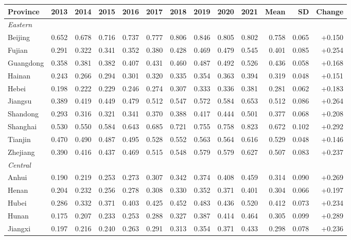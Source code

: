 \begin{tabular}{lrrrrrrrrrrrr}
\toprule
Province & 2013 & 2014 & 2015 & 2016 & 2017 & 2018 & 2019 & 2020 & 2021 & Mean & SD & Change \\
\midrule
\multicolumn{13}{l}{\textit{Eastern}} \\
Beijing & 0.652 & 0.678 & 0.716 & 0.737 & 0.777 & 0.806 & 0.846 & 0.805 & 0.802 & 0.758 & 0.065 & +0.150 \\
Fujian & 0.291 & 0.322 & 0.341 & 0.352 & 0.380 & 0.428 & 0.469 & 0.479 & 0.545 & 0.401 & 0.085 & +0.254 \\
Guangdong & 0.358 & 0.381 & 0.382 & 0.407 & 0.431 & 0.460 & 0.487 & 0.492 & 0.526 & 0.436 & 0.058 & +0.168 \\
Hainan & 0.243 & 0.266 & 0.294 & 0.301 & 0.320 & 0.335 & 0.354 & 0.363 & 0.394 & 0.319 & 0.048 & +0.151 \\
Hebei & 0.198 & 0.222 & 0.229 & 0.246 & 0.274 & 0.307 & 0.333 & 0.336 & 0.381 & 0.281 & 0.062 & +0.183 \\
Jiangsu & 0.389 & 0.419 & 0.449 & 0.479 & 0.512 & 0.547 & 0.572 & 0.584 & 0.653 & 0.512 & 0.086 & +0.264 \\
Shandong & 0.293 & 0.316 & 0.321 & 0.341 & 0.370 & 0.388 & 0.417 & 0.444 & 0.501 & 0.377 & 0.068 & +0.208 \\
Shanghai & 0.530 & 0.550 & 0.584 & 0.643 & 0.685 & 0.721 & 0.755 & 0.758 & 0.823 & 0.672 & 0.102 & +0.292 \\
Tianjin & 0.470 & 0.490 & 0.487 & 0.495 & 0.528 & 0.552 & 0.563 & 0.564 & 0.616 & 0.529 & 0.048 & +0.146 \\
Zhejiang & 0.390 & 0.416 & 0.437 & 0.469 & 0.515 & 0.548 & 0.579 & 0.579 & 0.627 & 0.507 & 0.083 & +0.237 \\
\midrule
\multicolumn{13}{l}{\textit{Central}} \\
Anhui & 0.190 & 0.219 & 0.253 & 0.273 & 0.307 & 0.342 & 0.374 & 0.408 & 0.459 & 0.314 & 0.090 & +0.269 \\
Henan & 0.204 & 0.232 & 0.256 & 0.278 & 0.308 & 0.330 & 0.352 & 0.371 & 0.401 & 0.304 & 0.066 & +0.197 \\
Hubei & 0.286 & 0.332 & 0.371 & 0.403 & 0.425 & 0.452 & 0.483 & 0.436 & 0.520 & 0.412 & 0.073 & +0.234 \\
Hunan & 0.175 & 0.207 & 0.233 & 0.253 & 0.288 & 0.327 & 0.387 & 0.414 & 0.464 & 0.305 & 0.099 & +0.289 \\
Jiangxi & 0.197 & 0.216 & 0.240 & 0.263 & 0.291 & 0.313 & 0.354 & 0.371 & 0.433 & 0.298 & 0.078 & +0.236 \\

\end{tabular}
